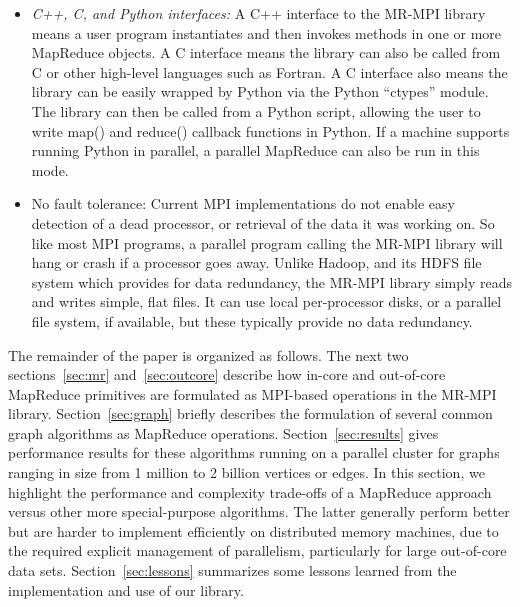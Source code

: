 \begin{itemize}
\item {\it C++, C, and Python interfaces:} A C++ interface to the
MR-MPI library means a user program instantiates and then invokes
methods in one or more MapReduce objects.  A C interface means the
library can also be called from C or other high-level languages such as
Fortran.  A C interface also means the library can be easily wrapped
by Python via the Python ``ctypes'' module.  The library can then be
called from a Python script, allowing the user to write map() and
reduce() callback functions in Python.  If a machine supports running
Python in parallel, a parallel MapReduce can also be run in this mode.

\item {No fault tolerance:} Current MPI implementations do not enable
easy detection of a dead processor, or retrieval of the data it was
working on.  So like most MPI programs, a parallel program calling the
MR-MPI library will hang or crash if a processor goes away.  Unlike
Hadoop, and its HDFS file system which provides for data redundancy,
the MR-MPI library simply reads and writes simple, flat files.  It can
use local per-processor disks, or a parallel file system, if
available, but these typically provide no data redundancy.

\end{itemize}

The remainder of the paper is organized as follows.  The next two
sections~\ref{sec:mr} and~\ref{sec:outcore} describe how in-core and
out-of-core MapReduce primitives are formulated as MPI-based
operations in the MR-MPI library.  Section~\ref{sec:graph} briefly
describes the formulation of several common graph algorithms as
MapReduce operations.  Section~\ref{sec:results} gives performance
results for these algorithms running on a parallel cluster for graphs
ranging in size from 1 million to 2 billion vertices or edges.  In
this section, we highlight the performance and complexity trade-offs
of a MapReduce approach versus other more special-purpose algorithms.
The latter generally perform better but are harder to implement
efficiently on distributed memory machines, due to the required
explicit management of parallelism, particularly for large out-of-core
data sets.  Section~\ref{sec:lessons} summarizes some lessons learned
from the implementation and use of our library.
